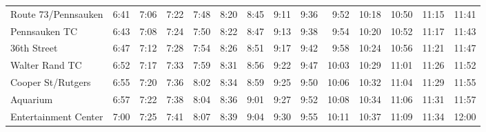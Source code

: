 \begin{center}
\begin{tabular}{@{}lrrrrrrrrrrrrr@{}}
Route 73/Pennsauken & 6:41 & 7:06 & 7:22 & 7:48 & 8:20 & 8:45 & 9:11 & 9:36 & 9:52 & 10:18 & 10:50 & 11:15 & 11:41 \\
Pennsauken TC & 6:43 & 7:08 & 7:24 & 7:50 & 8:22 & 8:47 & 9:13 & 9:38 & 9:54 & 10:20 & 10:52 & 11:17 & 11:43 \\
36th Street & 6:47 & 7:12 & 7:28 & 7:54 & 8:26 & 8:51 & 9:17 & 9:42 & 9:58 & 10:24 & 10:56 & 11:21 & 11:47 \\
Walter Rand TC & 6:52 & 7:17 & 7:33 & 7:59 & 8:31 & 8:56 & 9:22 & 9:47 & 10:03 & 10:29 & 11:01 & 11:26 & 11:52 \\
Cooper St/Rutgers & 6:55 & 7:20 & 7:36 & 8:02 & 8:34 & 8:59 & 9:25 & 9:50 & 10:06 & 10:32 & 11:04 & 11:29 & 11:55 \\
Aquarium & 6:57 & 7:22 & 7:38 & 8:04 & 8:36 & 9:01 & 9:27 & 9:52 & 10:08 & 10:34 & 11:06 & 11:31 & 11:57 \\
Entertainment Center & 7:00 & 7:25 & 7:41 & 8:07 & 8:39 & 9:04 & 9:30 & 9:55 & 10:11 & 10:37 & 11:09 & 11:34 & 12:00 \\
\bottomrule\end{tabular}\end{center}

